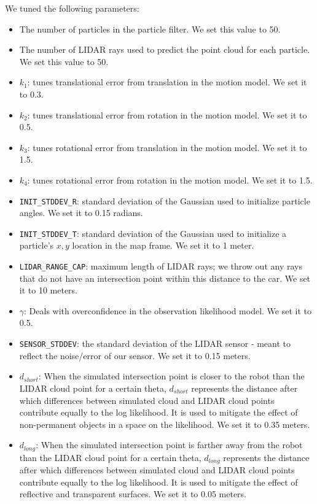 We tuned the following parameters:
\begin{itemize}
    \item The number of particles in the particle filter. We set this value to 50.
    \item The number of LIDAR rays used to predict the point cloud for each particle. We set this value to 50.
    \item $k_1$: tunes translational error from translation in the motion model. We set it to 0.3.
    \item $k_2$: tunes translational error from rotation in the motion model. We set it to 0.5.
    \item $k_3$: tunes rotational error from translation in the motion model. We set it to 1.5.
    \item $k_4$: tunes rotational error from rotation in the motion model. We set it to 1.5.
    \item \texttt{INIT\_STDDEV\_R}: standard deviation of the Gaussian used to initialize particle angles. We set it to 0.15 radians.
    \item \texttt{INIT\_STDDEV\_T}: standard deviation of the Gaussian used to initialize a particle's $x,y$ location in the map frame. We set it to 1 meter.
    \item \texttt{LIDAR\_RANGE\_CAP}: maximum length of LIDAR rays; we throw out any rays that do not have an intersection point within this distance to the car. We set it to 10 meters. 
    \item $\gamma$: Deals with overconfidence in the observation likelihood model. We set it to 0.5.
    \item \texttt{SENSOR\_STDDEV}: the standard deviation of the LIDAR sensor - meant to reflect the noise/error of our sensor. We set it to 0.15 meters.
    \item $d_{short}$: When the simulated intersection point is closer to the robot than the LIDAR cloud point for a certain theta, $d_{short}$ represents the distance after which differences between simulated cloud and LIDAR cloud points contribute equally to the log likelihood. It is used to mitigate the effect of non-permanent objects in a space on the likelihood. We set it to 0.35 meters. 
    \item $d_{long}$: When the simulated intersection point is farther away from the robot than the LIDAR cloud point for a certain theta, $d_{long}$ represents the distance after which differences between simulated cloud and LIDAR cloud points contribute equally to the log likelihood. It is used to mitigate the effect of reflective and transparent surfaces. We set it to 0.05 meters.
\end{itemize}


